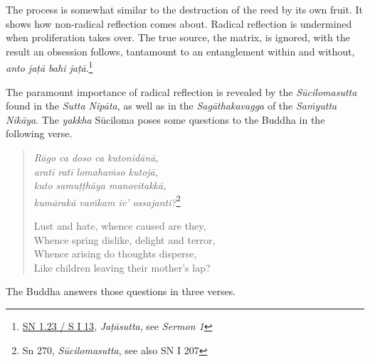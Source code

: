 The process is somewhat similar to the destruction of the reed by its own fruit. It shows how non-radical reflection comes about. Radical reflection is undermined when proliferation takes over. The true source, the matrix, is ignored, with the result an obsession follows, tantamount to an entanglement within and without, \emph{anto jaṭā bahi jaṭā}.\footnote{\href{https://suttacentral.net/sn1.23/pli/ms}{SN 1.23 / S I 13}, \emph{Jaṭāsutta}, see \emph{Sermon 1}}

The paramount importance of radical reflection is revealed by the \emph{Sūcilomasutta} found in the \emph{Sutta Nipāta}, as well as in the \emph{Sagāthakavagga} of the \emph{Saṁyutta Nikāya}. The \emph{yakkha} Sūciloma poses some questions to the Buddha in the following verse.

\begin{quote}
\emph{Rāgo ca doso ca kutonidānā,}\\
\emph{aratī ratī lomahaṁso kutojā,}\\
\emph{kuto samuṭṭhāya manovitakkā,}\\
\emph{kumārakā vaṁkam iv' ossajanti?}\footnote{Sn 270, \emph{Sūcilomasutta}, see also SN I 207}

Lust and hate, whence caused are they,\\
Whence spring dislike, delight and terror,\\
Whence arising do thoughts disperse,\\
Like children leaving their mother's lap?
\end{quote}

The Buddha answers those questions in three verses.

